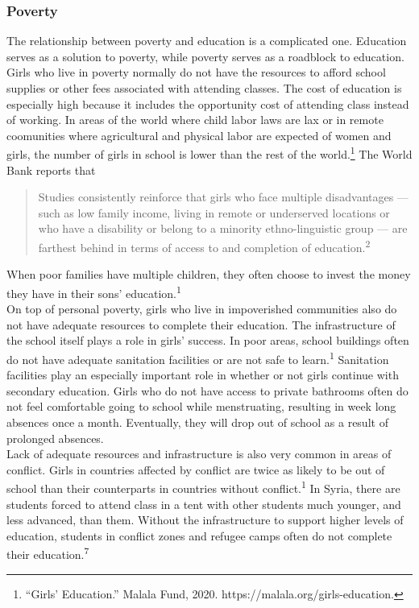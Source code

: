 \documentclass[10pt, letterpaper]{article}
\begin{document}
\subsubsection{Poverty}

The relationship between poverty and education is a complicated one.
Education serves as a solution to poverty, while poverty serves as a
roadblock to education. Girls who live in poverty normally do not have
the resources to afford school supplies or other fees associated with
attending classes. The cost of education is especially high because it
includes the opportunity cost of attending class instead of working. In
areas of the world where child labor laws are lax or in remote
coomunities where agricultural and physical labor are expected of women
and girls, the number of girls in school is lower than the rest of the
world.\footnote{``Girls' Education.'' Malala Fund, 2020.
  https://malala.org/girls-education.} The World Bank reports that

\begin{quote}
Studies consistently reinforce that girls who face multiple
disadvantages --- such as low family income, living in remote or
underserved locations or who have a disability or belong to a minority
ethno-linguistic group --- are farthest behind in terms of access to and
completion of education.\textsuperscript{2}
\end{quote}

When poor families have multiple children, they often choose to invest
the money they have in their sons' education.\textsuperscript{1} \\

On top of personal poverty, girls who live in impoverished communities
also do not have adequate resources to complete their education. The
infrastructure of the school itself plays a role in girls' success. In
poor areas, school buildings often do not have adequate sanitation
facilities or are not safe to learn.\textsuperscript{1} Sanitation
facilities play an especially important role in whether or not girls
continue with secondary education. Girls who do not have access to
private bathrooms often do not feel comfortable going to school while
menstruating, resulting in week long absences once a month. Eventually,
they will drop out of school as a result of prolonged absences. \\

Lack of adequate resources and infrastructure is also very common in
areas of conflict. Girls in countries affected by conflict are twice as
likely to be out of school than their counterparts in countries without
conflict.\textsuperscript{1} In Syria, there are students forced to
attend class in a tent with other students much younger, and less
advanced, than them. Without the infrastructure to support higher levels
of education, students in conflict zones and refugee camps often do not
complete their education.\textsuperscript{7} \\
\end{document}
